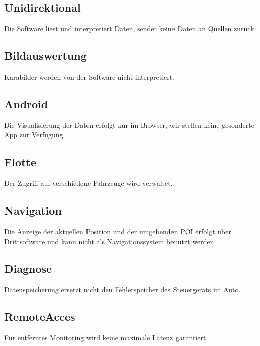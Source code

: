 \documentclass[pflichtenheft.tex]{subfiles}
\begin{document}
\subsection{\mknr Unidirektional} Die Software liest und interpretiert Daten, sendet keine Daten an Quellen zurück.

\subsection{\mknr Bildauswertung} Karabilder werden von der Software nicht interpretiert.

\subsection{\mknr Android} Die Visualisierung der Daten erfolgt nur im Browser, wir stellen keine gesonderte App zur Verfügung.

\subsection{\mknr Flotte} Der Zugriff auf verschiedene Fahrzeuge wird verwaltet.

\subsection{\mknr Navigation} Die Anzeige der aktuellen Position und der umgebenden POI erfolgt über Drittsoftware und kann nicht als Navigationssystem benutzt werden.

\subsection{\mknr Diagnose} Datenspeicherung ersetzt nicht den Fehlerspeicher des Steuergeräts im Auto.

\subsection{\mknr RemoteAcces} Für entferntes Monitoring wird keine maximale Latenz garantiert 
\end{document}
